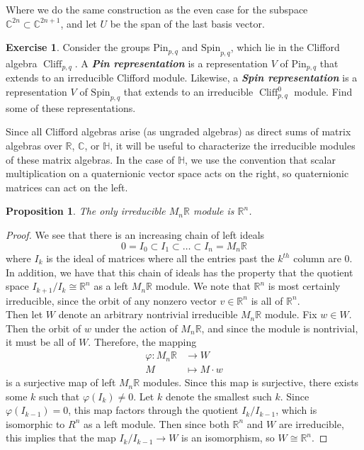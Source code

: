 \documentclass[psamsfonts]{amsart}
\newtheorem{prop}[thm]{Proposition}
\theoremstyle{definition}
\newtheorem{exer}[thm]{Exercise}
\theoremstyle{remark}
\newcommand{\R}{\mathbb{R}}
\newcommand{\ib}[1]{\textbf{\textit{#1}}}
\renewcommand{\H}{\mathbb{H}}
\newcommand{\C}{\mathbb{C}}
\newcommand{\Spin}{\mathrm{Spin}}
\newcommand{\Pin}{\mathrm{Pin}}
\DeclareMathOperator{\Cliff}{Cliff}
\begin{document}
Where we do the same construction as the even case for the subspace $\C^{2n} \subset \C^{2n+1}$, and let $U$ be the span of the last basis vector.
%
\begin{exer}
Consider the groups $\Pin_{p,q}$ and $\Spin_{p,q}$, which lie in the Clifford algebra $\Cliff_{p,q}$. A \ib{Pin representation} is a representation $V$ of $\Pin_{p,q}$ that extends to an irreducible Clifford module. Likewise, a \ib{Spin representation} is a representation $V$ of $\Spin_{p,q}$ that extends to an irreducible $\Cliff_{p,q}^0$ module. Find some of these representations.
\end{exer}
Since all Clifford algebras arise (as ungraded algebras) as direct sums of matrix algebras over $\R$, $\C$, or $\H$, it will be useful to characterize the irreducible modules of these matrix algebras. In the case of $\H$, we use the convention that scalar multiplication on a quaternionic vector space acts on the right, so quaternionic matrices can act on the left.
%
\begin{prop}
\item The only irreducible $M_n\R$  module is $\R^n$.
\end{prop}
%
\begin{proof}
We see that there is an increasing chain of left ideals 
\[
0 = I_0 \subset I_1 \subset \ldots \subset I_n = M_n\R
\]
where $I_k$ is the ideal of matrices where all the entries past the $k^{th}$ column are $0$. In addition, we have that this chain of ideals has the property that the quotient space $I_{k+1} / I_k \cong \R^n$ as a left $M_n\R$ module. We note that $\R^n$ is most certainly irreducible, since the orbit of any nonzero vector $v \in \R^n$ is all of $\R^n$. \\

Then let $W$ denote an arbitrary nontrivial irreducible $M_n\R$ module. Fix $w \in W$. Then the orbit of $w$ under the action of $M_n\R$, and since the module is nontrivial, it must be all of $W$. Therefore, the mapping 
\begin{align*}
\varphi : M_n\R &\to W \\
M &\mapsto M \cdot w
\end{align*}
is a surjective map of left $M_n\R$ modules. Since this map is surjective, there exists some $k$ such that $\varphi(I_k) \neq 0$. Let $k$ denote the smallest such $k$. Since $\varphi(I_{k-1}) = 0$, this map factors through the quotient $I_k / I_{k-1}$, which is isomorphic to $R^n$ as a left module. Then since both $\R^n$ and $W$ are irreducible, this implies that the map $I_k/I_{k-1} \to W$ is an isomorphism, so $W \cong \R^n$.
\end{proof}
\end{document}
